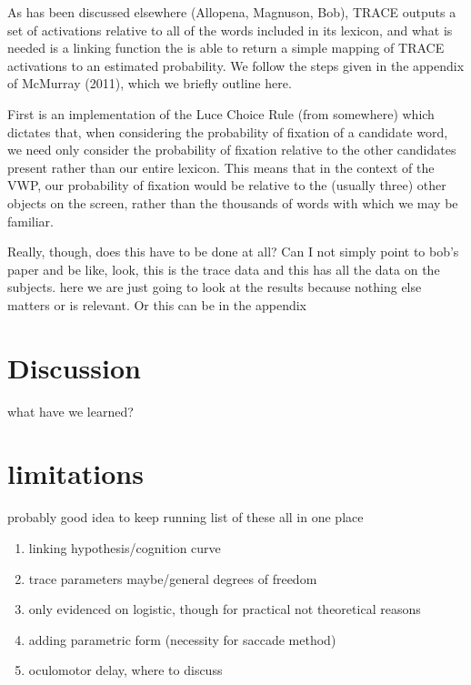 \documentclass{article}
\begin{document}
As has been discussed elsewhere (Allopena, Magnuson, Bob), TRACE outputs a set of activations relative to all of the words included in its lexicon, and what is needed is a linking function the is able to return a simple mapping of TRACE activations to an estimated probability. We follow the steps given in the appendix of McMurray (2011), which we briefly outline here. 

First is an implementation of the Luce Choice Rule (from somewhere) which dictates that, when considering the probability of fixation of a candidate word, we need only consider the probability of fixation relative to the other candidates present rather than our entire lexicon. This means that in the context of the VWP, our probability of fixation would be relative to the (usually three) other objects on the screen, rather than the thousands of words with which we may be familiar.  

Really, though, does this have to be done at all? Can I not simply point to bob's paper and be like, look, this is the trace data and this has all the data on the subjects. here we are just going to look at the results because nothing else matters or is relevant. Or this can be in the appendix


\section{Discussion}

what have we learned?


\section{limitations}

probably good idea to keep running list of these all in one place

\begin{enumerate}
\item linking hypothesis/cognition curve
\item trace parameters maybe/general degrees of freedom
\item only evidenced on logistic, though for practical not theoretical reasons
\item adding parametric form (necessity for saccade method)
\item oculomotor delay, where to discuss
\end{enumerate}

\end{document}
